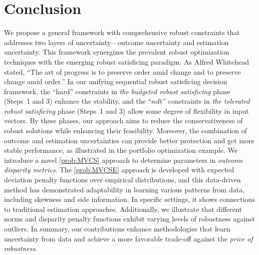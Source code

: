 \documentclass[opre, blindrev]{informs4}
\newcommand{\1}[1]{\mathds{1}{\left(#1\right)}}
\begin{document}
\section{Conclusion}
\label{sec:con}
We propose a general framework with comprehensive robust constraints that addresses two layers of uncertainty---outcome uncertainty and estimation uncertainty. This framework synergizes the prevalent robust optimization techniques with the emerging robust satisficing paradigm. As Alfred Whitehead stated, ``The art of progress is to preserve order amid change and to preserve change amid order.'' In our unifying sequential robust satisficing decision framework, the ``hard'' constraints in \emph{the budgeted robust satisficing} phase (Steps~1 and 3) enhance the stability, and the ``soft'' constraints in  \emph{the tolerated robust satisficing} phase (Steps~1 and 3) allow some degree of flexibility in input vectors. By these phases, our approach aims to reduce the conservativeness of robust solutions while enhancing their feasibility. Moreover, the combination of outcome and estimation uncertainties can provide better protection and get more stable performance, as illustrated in the portfolio optimization example. We introduce a novel \ref{prob:MVCS} approach to determine parameters in \emph{outcome disparity metrics}. The \ref{prob:MVCSE} approach is developed with expected deviation penalty functions over empirical distributions, and this data-driven method has demonstrated adaptability in learning various patterns from data, including skewness and side information. In specific settings, it shows connections to traditional estimation approaches. Additionally, we illustrate that different norms and disparity penalty functions exhibit varying levels of robustness against outliers. In summary, our contributions enhance methodologies that learn uncertainty from data and achieve a more favorable trade-off against the \emph{price of robustness}.




\end{document}
